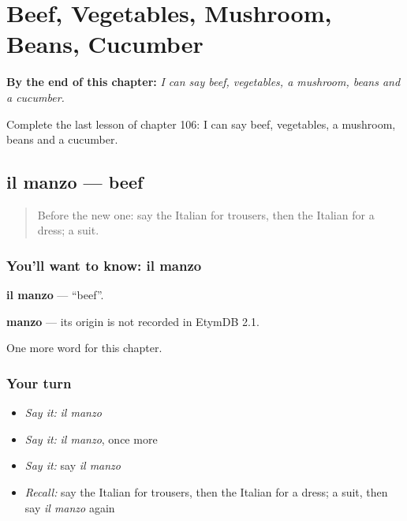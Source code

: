 
\chapter{Beef, Vegetables, Mushroom, Beans, Cucumber}
\label{ch:it-beef-vegetables-mushroom-beans-cucumber}

\begin{chapteropening}
\textbf{By the end of this chapter:} \emph{I can say beef, vegetables, a mushroom, beans and a cucumber.}

Complete the last lesson of chapter 106: I can say beef, vegetables, a mushroom, beans and a cucumber.
\end{chapteropening}

\section[il manzo]{il manzo — beef}

\label{lesson:IT-C106-manzo}



\begin{quote}
Before the new one: say the Italian for trousers, then the Italian for a dress; a suit.
\end{quote}

\subsection*{You'll want to know: il manzo}
\textbf{il manzo} — \textquotedblleft{}beef\textquotedblright{}.

\begin{cousinweb}
\textbf{manzo} — its origin is not recorded in EtymDB 2.1.
\end{cousinweb}

\begin{grammarlens}[title={What you've built}]
One more word for this chapter.
\end{grammarlens}

\subsection*{Your turn}
\begin{itemize}
\raggedright
  \item \emph{Say it:} \emph{il manzo}
  \item \emph{Say it:} \emph{il manzo}, once more
  \item \emph{Say it:} say \emph{il manzo}
  \item \emph{Recall:} say the Italian for trousers, then the Italian for a dress; a suit, then say \emph{il manzo} again
\end{itemize}


